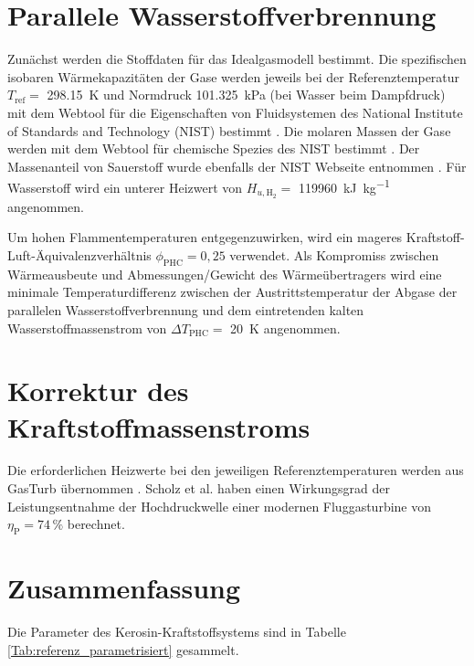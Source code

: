 \section{Parallele Wasserstoffverbrennung}

Zunächst werden die Stoffdaten für das Idealgasmodell bestimmt. Die spezifischen isobaren Wärmekapazitäten der Gase werden jeweils bei der Referenztemperatur $T_{\mathrm{ref}}=$ \SI{298.15}{\K} und Normdruck \SI{101.325}{\kilo\Pa} (bei Wasser beim Dampfdruck) mit dem Webtool für die Eigenschaften von Fluidsystemen des National Institute of Standards and Technology (NIST) bestimmt \cite{NationalInstituteofStandardsandTechnology.2023}. Die molaren Massen der Gase werden mit dem Webtool für chemische Spezies des NIST bestimmt \cite{NationalInstituteofStandardsandTechnology.2}. Der Massenanteil von Sauerstoff wurde ebenfalls der NIST Webseite entnommen \cite{NationalInstituteofStandardsandTechnology.n.d.}. Für Wasserstoff wird ein unterer Heizwert von $H_{u,\mathrm{H}_2}=$ \SI{119960}{\kilo\J\per\kg} angenommen. 

Um hohen Flammentemperaturen entgegenzuwirken, wird ein mageres Kraftstoff-Luft-Äquivalenzverhältnis $\phi_\mathrm{{PHC}}=0,25$ verwendet. Als Kompromiss zwischen Wärmeausbeute und Abmessungen/Gewicht des Wärmeübertragers wird eine minimale Temperaturdifferenz zwischen der Austrittstemperatur der Abgase der parallelen Wasserstoffverbrennung und dem eintretenden kalten Wasserstoffmassenstrom von $\Delta T_{\mathrm{PHC}}=$ \SI{20}{\K} angenommen. 

\section{Korrektur des Kraftstoffmassenstroms}

Die erforderlichen Heizwerte bei den jeweiligen Referenztemperaturen werden aus  GasTurb übernommen \cite{GasTurbGmbH.2021}. Scholz et al. \cite{Scholz.2013} haben einen Wirkungsgrad der Leistungsentnahme der Hochdruckwelle einer modernen Fluggasturbine von $\eta_\mathrm{P}=74\,\%$ berechnet.

\section{Zusammenfassung}

Die Parameter des Kerosin-Kraftstoffsystems sind in Tabelle \ref{Tab:referenz_parametrisiert} gesammelt.

